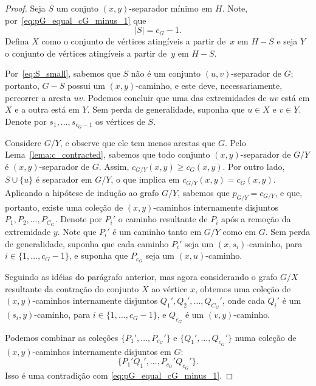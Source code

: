 \documentclass[12pt, a4paper]{article}
\theoremstyle{definition}
\begin{document}
\begin{proof}
Seja $S$ um conjnto $(x,y)$-separador mínimo em $H$. Note, por~\eqref{eq:pG_equal_cG_minus_1} que 
\begin{equation}
  \label{eq:S_small}
  |S| = c_G - 1.
\end{equation}
 Defina $X$ como o conjunto de vértices atingíveis a partir de~$x$ em $H - S$ e seja $Y$ o conjunto de vértices atingíveis a partir de~$y$ em $H - S$.

Por~\eqref{eq:S_small}, sabemos que $S$ não é um conjunto $(u,v)$-separador de $G$; portanto, $G - S$ possui um $(x,y)$-caminho, e este deve, necessariamente, percorrer a aresta $uv$. Podemos concluir que uma das extremidades de $uv$ está em $X$ e a outra está em $Y$. Sem perda de generalidade, suponha que $u \in X$ e $v \in Y$. Denote por $s_1, \dots, s_{c_G - 1}$ os vértices de $S$.

Considere $G/Y$, e observe que ele tem menos arestas que $G$. Pelo Lema~\ref{lema:c_contracted}, sabemos que todo conjunto $(x,y)$-separador de $G/Y$ é $(x,y)$-separador de $G$. Assim, $c_{G/Y}(x,y) \geq c_G(x,y)$. Por outro lado, $S \cup \{u\}$ é separador em $G/Y$, o que implica em $c_{G/Y}(x,y) = c_G(x,y)$. Aplicando a hipótese de indução ao grafo $G/Y$, sabemos que $p_{G/Y} = c_{G/Y}$, e que, portanto, existe uma coleção de $(x,y)$-caminhos internamente disjuntos $P_1, P_2, \dots, P_{C_G}$. Denote por $P_i'$ o caminho resultante de $P_i$ após a remoção da extremidade $y$. Note que $P_i'$ é um caminho tanto em $G/Y$ como em $G$. Sem perda de generalidade, suponha que cada caminho $P_i'$ seja um $(x,s_i)$-caminho, para $i \in \{1,\dots,c_G - 1\}$, e suponha que $P_{c_G}$ seja um $(x,u)$-caminho. 

Seguindo as idéias do parágrafo anterior, mas agora considerando o grafo $G/X$ resultante da contração do conjunto $X$ ao vértice $x$, %
obtemos uma coleção de $(x,y)$-caminhos internamente disjuntos $Q_1', Q_2', \dots, Q_{C_G}'$, onde cada $Q_i'$ é um $(s_i,y)$-caminho, para $i \in \{1,\dots,c_G - 1\}$, e $Q_{c_G}$ é um $(v,y)$-caminho.

Podemos combinar as coleções $\{P_1', \dots, P_{c_G}'\}$ e $\{Q_1', \dots, Q_{c_G}'\}$ numa coleção de $(x,y)$-caminhos internamente disjuntos em $G$:
\[\{P_1'Q_1', \dots, P_{c_G}'Q_{c_G}'\}.\]
Isso é uma contradição com \eqref{eq:pG_equal_cG_minus_1}.
\end{proof}
\end{document}
